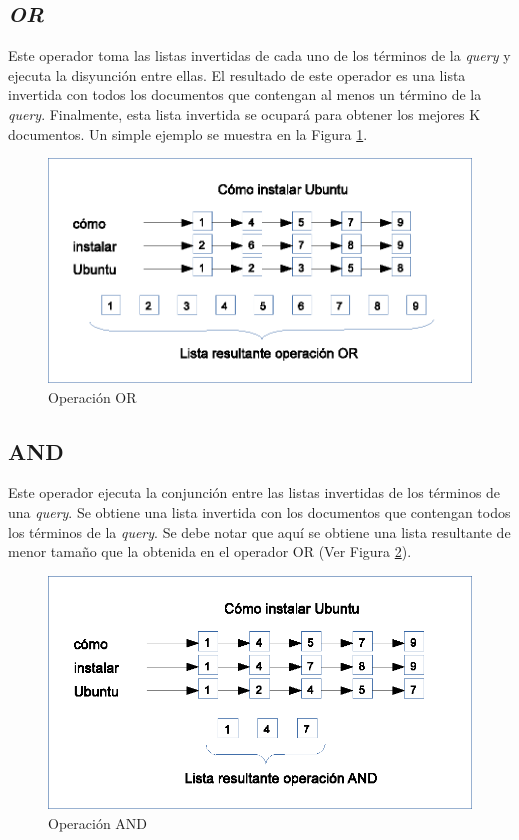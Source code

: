 \subsection{\textit{OR}}
\label{marco:or}
Este operador toma las listas invertidas de cada uno de los términos de la \textit{query} y ejecuta la disyunción entre ellas. El resultado de este operador es una lista invertida con todos los documentos que contengan al menos un término de la \textit{query}. Finalmente, esta lista invertida se ocupará para obtener los mejores K documentos. Un simple ejemplo se muestra en la Figura \ref{fig:ORoperation}.

\begin{figure}[!th]
\centering
\includegraphics[scale=.75]{images/ORoperation.eps}
\caption{Operaci\'on OR}
\label{fig:ORoperation}
\end{figure}

\subsection{AND}
\label{marco:and}
Este operador ejecuta la conjunción entre las listas invertidas de los términos de una \textit{query}. Se obtiene una lista invertida con los documentos que contengan todos los términos de la \textit{query}. Se debe notar que aquí se obtiene una lista resultante de menor tamaño que la obtenida en el operador OR (Ver Figura \ref{fig:ANDoperation}).

\begin{figure}[!th]
\centering
\includegraphics[scale=.75]{images/ANDoperation.eps}
\caption{Operaci\'on AND}
\label{fig:ANDoperation}
\end{figure}


